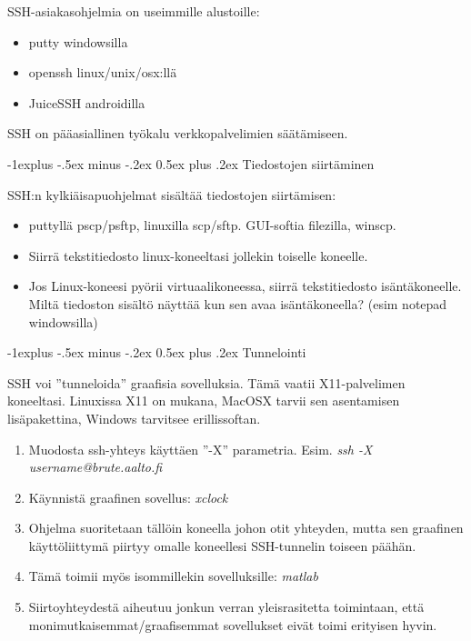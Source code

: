 \documentclass[12pt,portrait,a4]{article}
\makeatletter
\renewcommand{\subsection}{\@startsection{subsection}{2}{0mm}%
                                {-1explus -.5ex minus -.2ex}%
                                {0.5ex plus .2ex}%
                                {\normalfont\normalsize\bfseries}}
\makeatother
\begin{document}
SSH-asiakasohjelmia on useimmille alustoille:
\begin{itemize}
\item putty windowsilla
\item openssh linux/unix/osx:llä
\item JuiceSSH androidilla
\end{itemize}

SSH on pääasiallinen työkalu verkkopalvelimien säätämiseen.

\subsection{Tiedostojen siirtäminen}

SSH:n kylkiäisapuohjelmat sisältää tiedostojen siirtämisen:
\begin{itemize}
\item puttyllä pscp/psftp, linuxilla scp/sftp.  GUI-softia filezilla, winscp.
\item Siirrä tekstitiedosto linux-koneeltasi jollekin toiselle koneelle.
\item Jos Linux-koneesi pyörii virtuaalikoneessa, siirrä tekstitiedosto
isäntäkoneelle.  Miltä tiedoston sisältö näyttää kun sen avaa isäntäkoneella?
(esim notepad windowsilla)
\end{itemize}

\subsection{Tunnelointi}

SSH voi ''tunneloida'' graafisia sovelluksia.  Tämä vaatii X11-palvelimen
koneeltasi.  Linuxissa X11 on mukana, MacOSX tarvii sen asentamisen
lisäpakettina, Windows tarvitsee erillissoftan.

\begin{enumerate}
\item Muodosta ssh-yhteys käyttäen ''-X'' parametria.  Esim. \emph{ssh -X username@brute.aalto.fi}
\item Käynnistä graafinen sovellus: \emph{xclock}
\item Ohjelma suoritetaan tällöin koneella johon otit yhteyden, mutta sen
graafinen käyttöliittymä piirtyy omalle koneellesi SSH-tunnelin toiseen päähän.
\item Tämä toimii myös isommillekin sovelluksille: \emph{matlab}
\item Siirtoyhteydestä aiheutuu jonkun verran yleisrasitetta toimintaan, että
monimutkaisemmat/graafisemmat sovellukset eivät toimi erityisen hyvin.
\end{enumerate}
\end{document}
